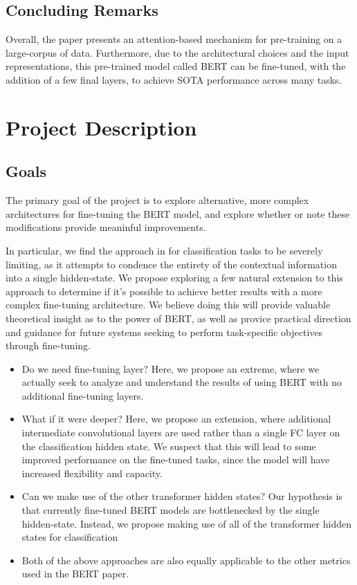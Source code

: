\documentclass{article}
\begin{document}
\subsection{Concluding Remarks}
Overall, the paper presents an attention-based mechanism for pre-training on a large-corpus of data. Furthermore, due to the architectural choices and the input representations, this pre-trained model called BERT can be fine-tuned, with the addition of a few final layers, to achieve SOTA performance across many tasks. 

\section{Project Description}
\subsection{Goals}
The primary goal of the project is to explore alternative, more complex architectures for fine-tuning the BERT model, and explore whether or note these modifications provide meaninful improvements.

In particular, we find the approach in \cite{BERT} for classification tasks to be severely limiting, as it attempts to condence the entirety of the contextual information into a single hidden-state. We propose exploring a few natural extension to this approach to determine if it's possible to achieve better results with a more complex fine-tuning architecture. We believe doing this will provide valuable theoretical insight as to the power of BERT, as well as provice practical direction and guidance for future systems seeking to perform task-specific objectives through fine-tuning.

\begin{itemize}
    \item Do we need fine-tuning layer? Here, we propose an extreme, where we actually seek to analyze and understand the results of using BERT with no additional fine-tuning layers.
    \item What if it were deeper? Here, we propose an extension, where additional intermediate convolutional layers are used rather than a single FC layer on the classification hidden state. We suspect that this will lead to some improved performance on the fine-tuned tasks, since the model will have increased flexibility and capacity.
    \item Can we make use of the other transformer hidden states? Our hypothesis is that currently fine-tuned BERT models are bottlenecked by the single hidden-state. Instead, we propose making use of all of the transformer hidden states for classification
    \item Both of the above approaches are also equally applicable to the other metrics used in the BERT paper.
\end{itemize} 
\end{document}
